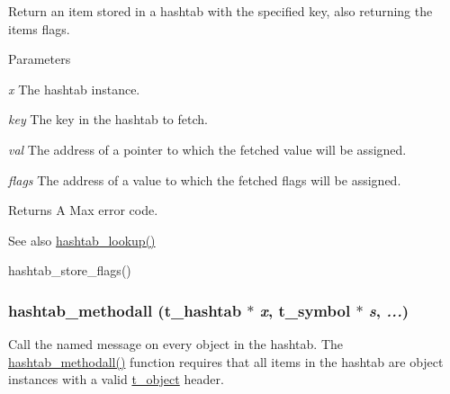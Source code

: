 Return an item stored in a hashtab with the specified key, also returning the items flags. 
\begin{DoxyParams}{Parameters}
\item[{\em x}]The hashtab instance. \item[{\em key}]The key in the hashtab to fetch. \item[{\em val}]The address of a pointer to which the fetched value will be assigned. \item[{\em flags}]The address of a value to which the fetched flags will be assigned. \end{DoxyParams}
\begin{DoxyReturn}{Returns}
A Max error code. 
\end{DoxyReturn}
\begin{DoxySeeAlso}{See also}
\hyperlink{group__hashtab_gadb206ea811204926bdbf1aa00ca679dc}{hashtab\_\-lookup()} 

hashtab\_\-store\_\-flags() 
\end{DoxySeeAlso}
\hypertarget{group__hashtab_ga816a6164c9565fd4269e2b9d8e8a76a3}{
\subsubsection[{hashtab\_\-methodall}]{ hashtab\_\-methodall ({\bf t\_\-hashtab} $\ast$ {\em x}, \/  {\bf t\_\-symbol} $\ast$ {\em s}, \/   {\em ...})}}
\label{group__hashtab_ga816a6164c9565fd4269e2b9d8e8a76a3}


Call the named message on every object in the hashtab. The \hyperlink{group__hashtab_ga816a6164c9565fd4269e2b9d8e8a76a3}{hashtab\_\-methodall()} function requires that all items in the hashtab are object instances with a valid \hyperlink{structt__object}{t\_\-object} header.


